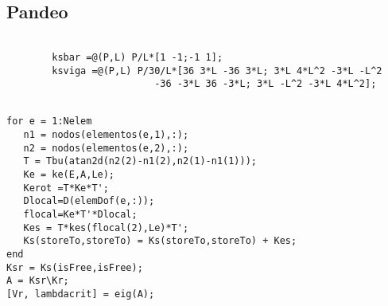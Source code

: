 \subsection{Pandeo}

\begin{code}
	\begin{verbatim}
	
		ksbar =@(P,L) P/L*[1 -1;-1 1];
		ksviga =@(P,L) P/30/L*[36 3*L -36 3*L; 3*L 4*L^2 -3*L -L^2
		                  -36 -3*L 36 -3*L; 3*L -L^2 -3*L 4*L^2];
	\end{verbatim}
\end{code}
\begin{code}
	\begin{verbatim}
	
for e = 1:Nelem
   n1 = nodos(elementos(e,1),:);
   n2 = nodos(elementos(e,2),:);
   T = Tbu(atan2d(n2(2)-n1(2),n2(1)-n1(1)));
   Ke = ke(E,A,Le);
   Kerot =T*Ke*T';
   Dlocal=D(elemDof(e,:));
   flocal=Ke*T'*Dlocal;
   Kes = T*kes(flocal(2),Le)*T';
   Ks(storeTo,storeTo) = Ks(storeTo,storeTo) + Kes;
end
Ksr = Ks(isFree,isFree);
A = Ksr\Kr;
[Vr, lambdacrit] = eig(A);
	\end{verbatim}
\end{code}